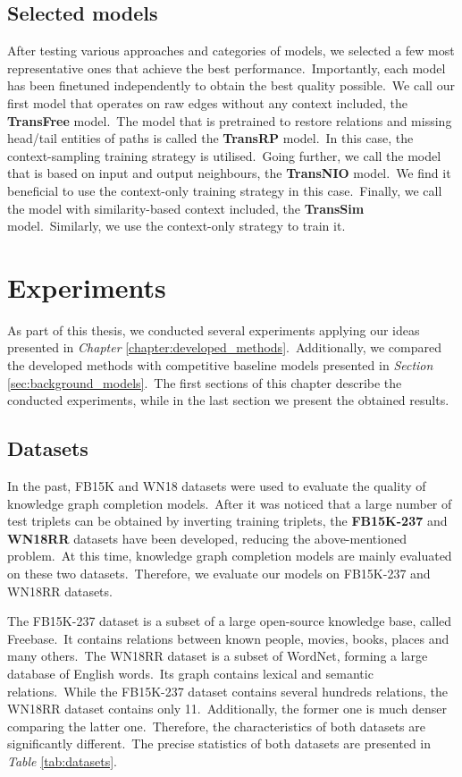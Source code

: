 \documentclass[longabstract, english, mgr]{iithesis}
\newcommand\numberedchapter[1]{\setlength\topskip{3cm}\chapter{#1}\setlength\topskip{0cm}}
\theoremstyle{default_theorem_style}\newtheorem{theorem}{Theorem}
\theoremstyle{default_theorem_style}\newtheorem{definition}{Definition}
\begin{document}
\section{Selected models}\label{sec:selected_models}

After testing various approaches and categories of models, we selected a few most representative ones that achieve the
best performance.\ Importantly, each model has been finetuned independently to obtain the best quality
possible.\ We call our first model that operates on raw edges without any context included, the
\textbf{TransFree} model.\ The model that is pretrained to restore relations and missing head/tail entities of paths
is called the \textbf{TransRP} model.\ In this case, the context-sampling training strategy is utilised.\ Going
further, we call the model that is based on input and output neighbours, the \textbf{TransNIO} model.\ We find it
beneficial to use the context-only training strategy in this case.\ Finally, we call the model with
similarity-based context included, the \textbf{TransSim} model.\ Similarly, we use the context-only strategy to
train it.

\numberedchapter{Experiments}\label{chapter:experiments}

As part of this thesis, we conducted several experiments applying our ideas presented in
\textit{Chapter} \ref{chapter:developed_methods}.\ Additionally, we compared the developed methods with competitive
baseline models presented in \textit{Section} \ref{sec:background_models}.\ The first sections of this chapter describe
the conducted experiments, while in the last section we present the obtained results.

\section{Datasets}

In the past, FB15K and WN18 datasets were used to evaluate the quality of knowledge graph completion models.\ After
it was noticed that a large number of test triplets can be obtained by inverting training triplets, the
\textbf{FB15K-237} and \textbf{WN18RR} datasets have been developed, reducing the above-mentioned problem.\ At this
time, knowledge graph completion models are mainly evaluated on these two datasets.\ Therefore, we evaluate our models
on FB15K-237 and WN18RR datasets.\newline

\noindent The FB15K-237 dataset is a subset of a large open-source knowledge base, called Freebase.\ It contains
relations between known people, movies, books, places and many others.\ The WN18RR dataset is a subset of WordNet,
forming a large database of English words.\ Its graph contains lexical and semantic relations.\ While the FB15K-237
dataset contains several hundreds relations, the WN18RR dataset contains only 11.\ Additionally, the former
one is much denser comparing the latter one.\ Therefore, the characteristics of both datasets are significantly
different.\ The precise statistics of both datasets are presented in \textit{Table} \ref{tab:datasets}.
\end{document}
